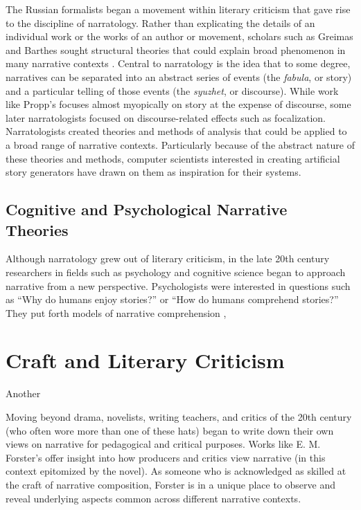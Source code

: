 The Russian formalists began a movement within literary criticism that gave rise to the discipline of narratology.
%
Rather than explicating the details of an individual work or the works of an author or movement, scholars such as Greimas and Barthes sought structural theories that could explain broad phenomenon in many narrative contexts \citep{Barthes1975,Greimas1988}.
%
Central to narratology is the idea that to some degree, narratives can be separated into an abstract series of events (the \textit{fabula}, or story) and a particular telling of those events (the \textit{syuzhet}, or discourse).
%
While work like Propp's focuses almost myopically on story at the expense of discourse, some later narratologists focused on discourse-related effects such as focalization.
%
Narratologists created theories and methods of analysis that could be applied to a broad range of narrative contexts.
%
Particularly because of the abstract nature of these theories and methods, computer scientists interested in creating artificial story generators have drawn on them as inspiration for their systems.


\subsection{Cognitive and Psychological Narrative Theories}

Although narratology grew out of literary criticism, in the late 20th century researchers in fields such as psychology and cognitive science began to approach narrative from a new perspective.
%
Psychologists were interested in questions such as ``Why do humans enjoy stories?'' or ``How do humans comprehend stories?''
%
They put forth models of narrative comprehension \citep{Kintsch1980,Brewer1982}, 

\cite{Iran-Nejad1987}
\cite{Oatley1995, Oatley1999}
\cite{Mar2004, Mar2008}
\cite{Zunshine2006}


\section{Craft and Literary Criticism}

Another 

Moving beyond drama, novelists, writing teachers, and critics of the 20th century (who often wore more than one of these hats) began to write down their own views on narrative for pedagogical and critical purposes.
%
Works like E. M. Forster's  \citep{Forster1927} offer insight into how producers and critics view narrative (in this context epitomized by the novel).
%
As someone who is acknowledged as skilled at the craft of narrative composition, Forster is in a unique place to observe and reveal underlying aspects common across different narrative contexts.


